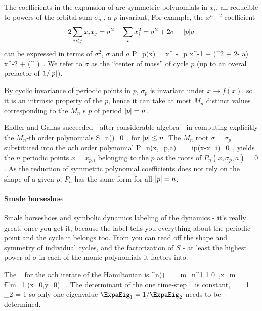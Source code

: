 The coefficients in the
expansion of  are symmetric polynomials in $x_i$,
all reducible to powers of the orbital sum  $\sigma_p$
, a {\orbit} $p$ invariant,
For example, the $x^{n-2}$ coefficient
\[
2 \sum_{i<j} x_i x_j =
    \sigma^2 - \sum_i x^2_i
    =
    \sigma^2 + 2\sigma - {|p|}a
\]
can be expressed in terms of $\sigma^2$, $\sigma$ and $a$
\beq
P_p(x) = x^ -\sigma_p x^{-1}
     + (\sigma^2 + 2\sigma - a)  x^{-2}
     + \cdots \pm (\sigma^ \cdots)
\,.
We refer to $\sigma$ as the ``center of mass'' of cycle $p$
(up to an overal prefactor of $1/{|p|}$).

By cyclic invariance of periodic points in $p$, $\sigma_p$ is
invariant under $x \to f(x)$, so it is an intrinsic property of the
{\orbit} $p$, hence it can take at most  $M_n$ distinct values
corresponding to the $M_n$
{\orbit}s $p$ of period ${|p|}=n$.

Endler and Gallas succeeded - after considerable algebra - in computing
explicitly the
$M_n$-th order polynomials
\beq
S_n(\sigma)=0
\,,
for ${|p|}\leq n$.
The $M_n$ root $\sigma=\sigma_p$
substituted into the $n$th order polynomial
\beq
P_n(x,\sigma_p,a) = \prod_{i\in p}(x-x_i)=0
\,,
yields the $n$ periodic points $x=x_{p,i}$
belonging to the {\orbit} $p$ as the roots of $P_n(x,\sigma_p,a)=0$.
As the reduction of symmetric polynomial coefficients does not
rely on the shape of a given {\orbit} $p$,  $P_n$ has
the same form for all ${|p|} = n$.


\paragraph{Smale horseshoe}

Smale horseshoes and
symbolic dynamics labeling of the dynamics - it's really great, once you
get it, because the label tells you everything about the periodic point and
the cycle it belongs too. From 
 you can read off the shape and
symmetry of individual cycles, and the factorization of $S$ - at least the
highest power of $\sigma$ in each of the monic polynomials it factors into.

The \jacobianM\ %
for the $n$th iterate of the Hamiltonian {\HenonMap} is
\beq
\monodromy^n(\xInit) = \prod_{m=n}^{1}
                   {1}  {0}
\,,\qquad x_m = f^{m}_1 (x_0,y_0)
\, .
The determinant of the {\Henon} one time-step \jacobianM\ 
is constant,
\beq
\det\monodromy = \ExpaEig_1 \ExpaEig_2 = 1
so only one eigenvalue $\ExpaEig_1 = 1/\ExpaEig_2$
needs to be determined.


